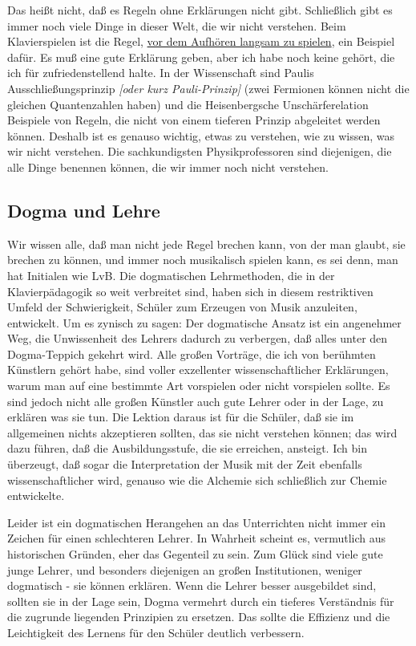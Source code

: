 Das heißt nicht, daß es Regeln ohne Erklärungen nicht gibt.
 Schließlich gibt es immer noch viele Dinge in dieser Welt, die wir nicht verstehen.
 Beim Klavierspielen ist die Regel, \hyperlink{c1ii17}{vor dem Aufhören langsam zu spielen}, ein Beispiel dafür.
 Es muß eine gute Erklärung geben, aber ich habe noch keine gehört, die ich für zufriedenstellend halte.
 In der Wissenschaft sind Paulis Ausschließungsprinzip \textit{[oder kurz Pauli-Prinzip]} (zwei Fermionen können nicht die gleichen Quantenzahlen haben) und die Heisenbergsche Unschärferelation Beispiele von Regeln, die nicht von einem tieferen Prinzip abgeleitet werden können.
 Deshalb ist es genauso wichtig, etwas zu verstehen, wie zu wissen, was wir nicht verstehen.
 Die sachkundigsten Physikprofessoren sind diejenigen, die alle Dinge benennen können, die wir immer noch nicht verstehen.
 \hypertarget{c3_3g}{}

\subsection{Dogma und Lehre}

Wir wissen alle, daß man nicht jede Regel brechen kann, von der man glaubt, sie brechen zu können, und immer noch musikalisch spielen kann, es sei denn, man hat Initialen wie LvB.
 Die dogmatischen Lehrmethoden, die in der Klavierpädagogik so weit verbreitet sind, haben sich in diesem restriktiven Umfeld der Schwierigkeit, Schüler zum Erzeugen von Musik anzuleiten, entwickelt.
 Um es zynisch zu sagen: Der dogmatische Ansatz ist ein angenehmer Weg, die Unwissenheit des Lehrers dadurch zu verbergen, daß alles unter den Dogma-Teppich gekehrt wird.
 Alle großen Vorträge, die ich von berühmten Künstlern gehört habe, sind voller exzellenter wissenschaftlicher Erklärungen, warum man auf eine bestimmte Art vorspielen oder nicht vorspielen sollte.
 Es sind jedoch nicht alle großen Künstler auch gute Lehrer oder in der Lage, zu erklären was sie tun.
 Die Lektion daraus ist für die Schüler, daß sie im allgemeinen nichts akzeptieren sollten, das sie nicht verstehen können; das wird dazu führen, daß die Ausbildungsstufe, die sie erreichen, ansteigt.
 Ich bin überzeugt, daß sogar die Interpretation der Musik mit der Zeit ebenfalls wissenschaftlicher wird, genauso wie die Alchemie sich schließlich zur Chemie entwickelte.
 

Leider ist ein dogmatischen Herangehen an das Unterrichten nicht immer ein Zeichen für einen schlechteren Lehrer.
 In Wahrheit scheint es, vermutlich aus historischen Gründen, eher das Gegenteil zu sein.
 Zum Glück sind viele gute junge Lehrer, und besonders diejenigen an großen Institutionen, weniger dogmatisch - sie können erklären.
 Wenn die Lehrer besser ausgebildet sind, sollten sie in der Lage sein, Dogma vermehrt durch ein tieferes Verständnis für die zugrunde liegenden Prinzipien zu ersetzen.
 Das sollte die Effizienz und die Leichtigkeit des Lernens für den Schüler deutlich verbessern.
 

